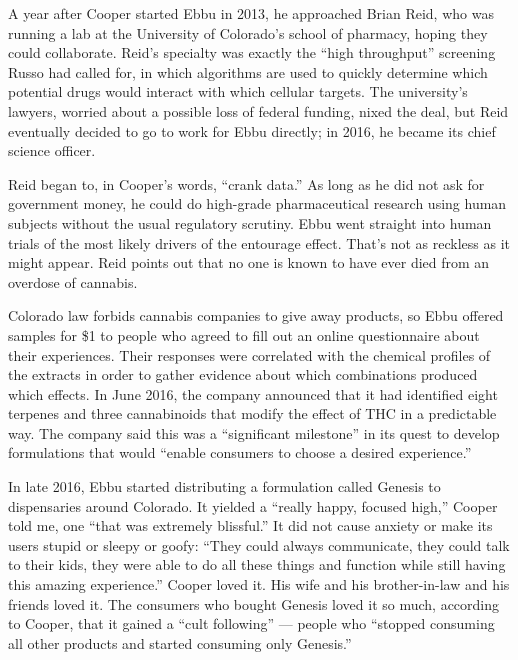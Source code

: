 A year after Cooper started Ebbu in 2013, he approached Brian Reid, who
was running a lab at the University of Colorado's school of pharmacy,
hoping they could collaborate. Reid's specialty was exactly the ``high
throughput'' screening Russo had called for, in which algorithms are
used to quickly determine which potential drugs would interact with
which cellular targets. The university's lawyers, worried about a
possible loss of federal funding, nixed the deal, but Reid eventually
decided to go to work for Ebbu directly; in 2016, he became its chief
science officer.

Reid began to, in Cooper's words, ``crank data.'' As long as he did not
ask for government money, he could do high-grade pharmaceutical research
using human subjects without the usual regulatory scrutiny. Ebbu went
straight into human trials of the most likely drivers of the entourage
effect. That's not as reckless as it might appear. Reid points out that
no one is known to have ever died from an overdose of cannabis.

Colorado law forbids cannabis companies to give away products, so Ebbu
offered samples for \$1 to people who agreed to fill out an online
questionnaire about their experiences. Their responses were correlated
with the chemical profiles of the extracts in order to gather evidence
about which combinations produced which effects. In June 2016, the
company announced that it had identified eight terpenes and three
cannabinoids that modify the effect of THC in a predictable way. The
company said this was a ``significant milestone'' in its quest to
develop formulations that would ``enable consumers to choose a desired
experience.''

In late 2016, Ebbu started distributing a formulation called Genesis to
dispensaries around Colorado. It yielded a ``really happy, focused
high,'' Cooper told me, one ``that was extremely blissful.'' It did not
cause anxiety or make its users stupid or sleepy or goofy: ``They could
always communicate, they could talk to their kids, they were able to do
all these things and function while still having this amazing
experience.'' Cooper loved it. His wife and his brother-in-law and his
friends loved it. The consumers who bought Genesis loved it so much,
according to Cooper, that it gained a ``cult following'' --- people who
``stopped consuming all other products and started consuming only
Genesis.''

